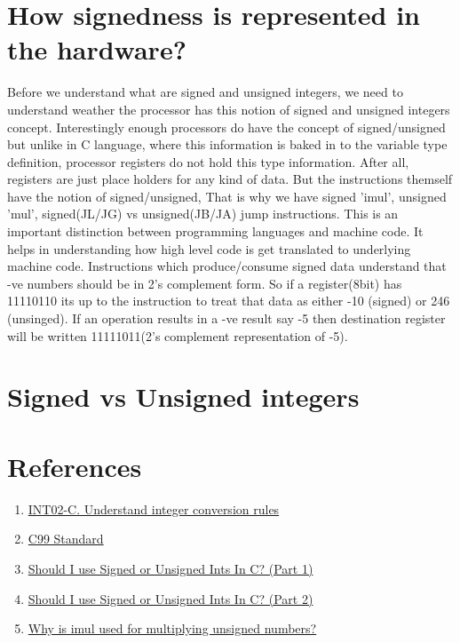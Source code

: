 \documentclass{article}
\begin{document}
\section{How signedness is represented in the hardware?}
Before we understand what are signed and unsigned integers, we need to
understand weather the processor has this notion of signed and unsigned
integers concept. Interestingly enough processors do have the concept of
signed/unsigned but unlike in C language, where this information is baked in to
the variable type definition, processor registers do not hold this type
information. After all, registers are just place holders for any kind of
data. But the instructions themself have the notion of signed/unsigned, That
is why we have signed 'imul', unsigned 'mul', signed(JL/JG) vs unsigned(JB/JA)
jump instructions. This is an important distinction between programming
languages and machine code. It helps in understanding how high level code is get
translated to underlying machine code. Instructions which produce/consume signed
data understand that -ve numbers should be in 2's complement form. So if a
register(8bit) has 11110110 its up to the instruction to treat that data as
either -10 (signed) or 246 (unsinged). If an operation results in a -ve result
say -5 then destination register will be written 11111011(2's complement
representation of -5).

\section{Signed vs Unsigned integers}





\section{References}
\begin{enumerate}[noitemsep]
\item \href{https://wiki.sei.cmu.edu/confluence/display/c/INT02-C.+Understand+integer+conversion+rules}{INT02-C. Understand integer conversion rules}
\item \href{http://www.open-std.org/jtc1/sc22/wg14/www/docs/n1256.pdf}{C99 Standard}
\item \href{http://blog.robertelder.org/signed-or-unsigned/}{Should I use Signed or Unsigned Ints In C? (Part 1)}
\item \href{http://blog.robertelder.org/signed-or-unsigned-part-2/}{Should I use Signed or Unsigned Ints In C? (Part 2)}
\item \href{https://stackoverflow.com/a/42589535/2407966}{Why is imul used for multiplying unsigned numbers?}

\end{enumerate}
\end{document}
